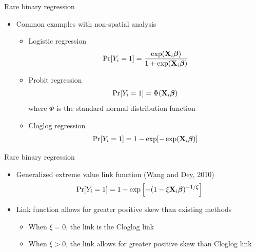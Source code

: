 \documentclass{beamer}
\begin{document}
\begin{frame}{Rare binary regression}
  \begin{itemize} \setlength{\itemsep}{1em}
    \item Common examples with non-spatial analysis
    \begin{itemize}
      \item Logistic regression
      \begin{align*}
        \Pr[Y_i = 1] = \frac{ \exp(\mbox{\bf X}_i \mbox{\boldmath $\beta$}) }{ 1 + \exp(\mbox{\bf X}_i \mbox{\boldmath $\beta$})}
      \end{align*}
      \item Probit regression
      \begin{align*}
        \Pr[Y_i = 1] = \Phi(\mbox{\bf X}_i \mbox{\boldmath $\beta$})
      \end{align*}
      where $\Phi$ is the standard normal distribution function
      \item Cloglog regression
      \begin{align*}
        \Pr[Y_i = 1] = 1 - \exp[ -\exp(\mbox{\bf X}_i \mbox{\boldmath $\beta$})]
      \end{align*}
    \end{itemize}
  \end{itemize}
\end{frame}

\begin{frame}{Rare binary regression}
  \begin{itemize} \setlength{\itemsep}{1em}
    \item Generalized extreme value link function (Wang and Dey, 2010)
    \begin{align*}
      \Pr[Y_i = 1] = 1 - \exp\left[-(1 - \xi \mbox{\bf X}_i \mbox{\boldmath $\beta$})^{-1 / \xi} \right]
    \end{align*}
    \item Link function allows for greater positive skew than existing methods
    \begin{itemize}
      \item When $\xi = 0$, the link is the Cloglog link
      \item When $\xi > 0$, the link allows for greater positive skew than Cloglog link
    \end{itemize}
  \end{itemize}
\end{frame}
\end{document}
